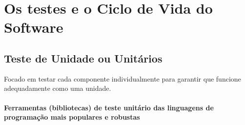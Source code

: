 \documentclass[
]{book}
\begin{document}
\section{Os testes e o Ciclo de Vida do Software}\label{os-testes-e-o-ciclo-de-vida-do-software}

\subsection{Teste de Unidade ou Unitários}\label{teste-de-unidade-ou-unituxe1rios}

Focado em testar cada componente individualmente para garantir que funcione adequadamente como uma unidade.

\paragraph{Ferramentas (bibliotecas) de teste unitário das linguagens de programação mais populares e robustas}\label{ferramentas-bibliotecas-de-teste-unituxe1rio-das-linguagens-de-programauxe7uxe3o-mais-populares-e-robustas}
\end{document}
